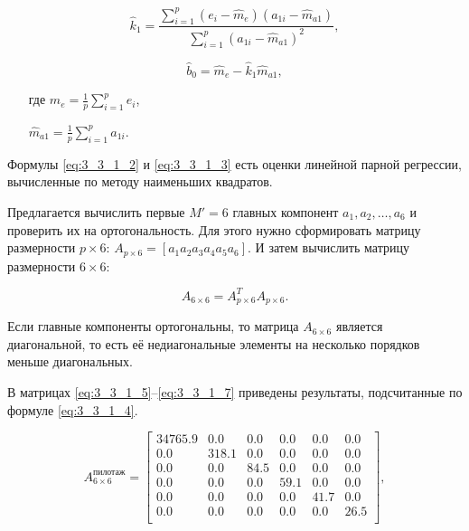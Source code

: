 \begin{equation} \label{eq:3_3_1_2}
\widehat{k}_1 = \frac{\sum_{i=1}^p (e_i - \widehat{m}_e)(a_{1i} - \widehat{m}_{a1})}{\sum_{i=1}^p (a_{1i} - \widehat{m}_{a1})^2},	
\end{equation}

\begin{equation} \label{eq:3_3_1_3}
\widehat{b}_0 = \widehat{m}_e - \widehat{k}_1 \widehat{m}_{a1},
\end{equation}
\begin{itemize}[align=left,leftmargin=1.8em,itemindent=0pt,labelsep=0pt,labelwidth=1.8em]
	\item[где] $\widehat{m}_e = \frac{1}{p} \sum_{i=1}^p e_i$,
	\item[] $\widehat{m}_{a1} = \frac{1}{p} \sum_{i=1}^p a_{1i}$.
\end{itemize}

Формулы \eqref{eq:3_3_1_2} и \eqref{eq:3_3_1_3} есть оценки линейной парной регрессии, вычисленные по методу наименьших квадратов.

Предлагается вычислить первые $M' = 6$ главных компонент $a_1, a_2, \dots, a_6$ и проверить их на ортогональность.
Для этого нужно сформировать матрицу размерности $p \times 6$: $A_{p \times 6} = [a_1 a_2 a_3 a_4 a_5 a_6]$.
И затем вычислить матрицу размерности $6 \times 6$:

\begin{equation} \label{eq:3_3_1_4}
A_{6 \times 6} = A_{p \times 6}^T A_{p \times 6}.
\end{equation}

Если главные компоненты ортогональны, то матрица $A_{6 \times 6}$ является диагональной, то есть её недиагональные элементы на несколько порядков меньше диагональных. 

В матрицах \eqref{eq:3_3_1_5}--\eqref{eq:3_3_1_7} приведены результаты, подсчитанные по формуле \eqref{eq:3_3_1_4}.

\begin{equation} \label{eq:3_3_1_5}
A_{6 \times 6}^{\text{пилотаж}} =
\begin{bmatrix}
34765.9	& 0.0	& 0.0	& 0.0	& 0.0	& 0.0	\\
0.0		& 318.1	& 0.0	& 0.0	& 0.0	& 0.0	\\
0.0		& 0.0	& 84.5	& 0.0	& 0.0	& 0.0	\\
0.0		& 0.0	& 0.0	& 59.1	& 0.0	& 0.0	\\
0.0		& 0.0	& 0.0	& 0.0	& 41.7	& 0.0	\\
0.0		& 0.0	& 0.0	& 0.0	& 0.0	& 26.5	\\
\end{bmatrix},
\end{equation}

